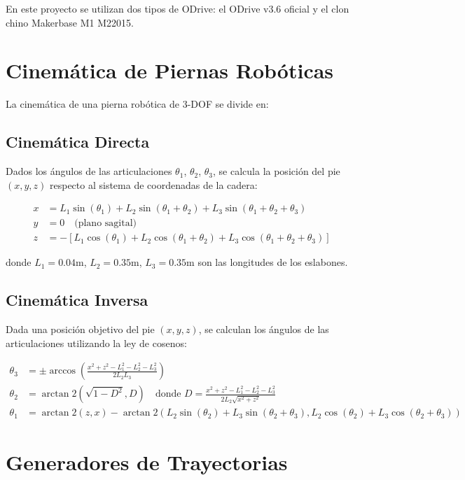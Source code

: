 En este proyecto se utilizan dos tipos de ODrive: el ODrive v3.6 oficial y el clon chino Makerbase M1 M22015.

\section{Cinemática de Piernas Robóticas}

La cinemática de una pierna robótica de 3-DOF se divide en:

\subsection{Cinemática Directa}

Dados los ángulos de las articulaciones $\theta_1$, $\theta_2$, $\theta_3$, se calcula la posición del pie $(x, y, z)$ respecto al sistema de coordenadas de la cadera:

\begin{align}
x &= L_1 \sin(\theta_1) + L_2 \sin(\theta_1 + \theta_2) + L_3 \sin(\theta_1 + \theta_2 + \theta_3) \\
y &= 0 \quad \text{(plano sagital)} \\
z &= -[L_1 \cos(\theta_1) + L_2 \cos(\theta_1 + \theta_2) + L_3 \cos(\theta_1 + \theta_2 + \theta_3)]
\end{align}

donde $L_1 = 0.04$m, $L_2 = 0.35$m, $L_3 = 0.35$m son las longitudes de los eslabones.

\subsection{Cinemática Inversa}

Dada una posición objetivo del pie $(x, y, z)$, se calculan los ángulos de las articulaciones utilizando la ley de cosenos:

\begin{align}
\theta_3 &= \pm \arccos\left(\frac{x^2 + z^2 - L_1^2 - L_2^2 - L_3^2}{2 L_2 L_3}\right) \\
\theta_2 &= \arctan2(\sqrt{1 - D^2}, D) \quad \text{donde } D = \frac{x^2 + z^2 - L_1^2 - L_2^2 - L_3^2}{2 L_2 \sqrt{x^2 + z^2}} \\
\theta_1 &= \arctan2(z, x) - \arctan2(L_2 \sin(\theta_2) + L_3 \sin(\theta_2 + \theta_3), L_2 \cos(\theta_2) + L_3 \cos(\theta_2 + \theta_3))
\end{align}

\section{Generadores de Trayectorias}

